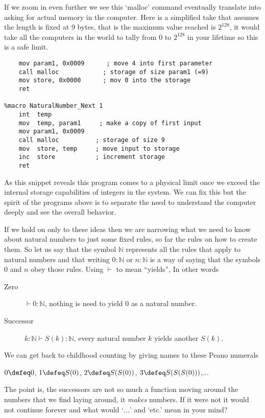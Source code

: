If we zoom in even further we see this `malloc' command eventually 
translate into asking for actual memory in the computer.  Here is a
simplified take that assumes the length is fixed at 9 bytes, that is 
the maximum value reached is $2^{128}$, it would take all the computers 
in the world to tally from $0$ to $2^{128}$ in your lifetime so 
this is a safe limit.
\begin{center}
\begin{lstlisting}[language={ [x86masm]Assembler}]
%macro NaturalNumber_Zero 0
    mov param1, 0x0009      ; move 4 into first parameter
    call malloc            ; storage of size param1 (=9)
    mov store, 0x0000      ; mov 0 into the storage
    ret 

%macro NaturalNumber_Next 1
    int  temp
    mov  temp, param1     ; make a copy of first input
    mov param1, 0x0009      
    call malloc          ; storage of size 9
    mov  store, temp     ; move input to storage
    inc  store           ; increment storage 
    ret 
\end{lstlisting}
\end{center}

As this snippet reveals this program comes to a physical limit 
once we exceed the internal storage capabilities of integers in the
system.  We can fix this but the spirit of the programs above 
is to separate the need to understand the computer deeply and see the 
overall behavior.



If we hold on only to these ideas then we are narrowing what we need 
to know about natural numbers to just some fixed rules, so far the rules 
on how to create them.  So let us say that the symbol $\mathbb{N}$ represents 
all the rules that apply to natural numbers and that writing $0:\mathbb{N}$ or 
$n:\mathbb{N}$ is a way of saying that the symbols $0$ and $n$ obey those rules.
Using $\vdash$ to mean  ``yields'', 
In other words
\begin{description}
    \item[Zero] $\vdash 0: \mathbb{N}$, nothing is need to  yield $0$ as a natural number.
    \item[Successor] $k:\mathbb{N}\vdash S(k):\mathbb{N}$, every natural number  $k$ yields 
    another $S(k)$.
\end{description}
We can get back to childhood 
counting by giving names to these Peano numerals
\begin{center}
    $0\defeq 0$,
    $1\defeq S(0)$,
    $2\defeq S(S(0))$,
    $3\defeq S(S(S(0)))$,...
\end{center}
The point is, the successors are not so much a function 
moving around the numbers that we find laying around, it
\emph{makes} numbers.  
If it were not it would not continue forever 
and what would `$\ldots$' and `etc.' mean in your mind?

